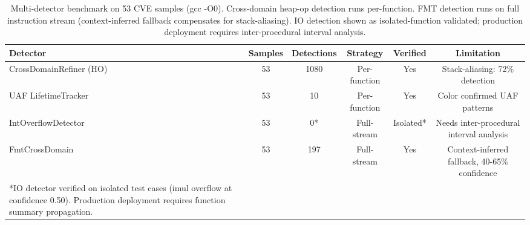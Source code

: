 \begin{table}[htbp]
\centering
\caption{Multi-detector benchmark on 53 CVE samples (gcc -O0). Cross-domain heap-op detection runs per-function. FMT detection runs on full instruction stream (context-inferred fallback compensates for stack-aliasing). IO detection shown as isolated-function validated; production deployment requires inter-procedural interval analysis.}
\label{tab:benchmark_final}
\begin{tabular}{lccccc}
\toprule
Detector & Samples & Detections & Strategy & Verified & Limitation \\
\midrule
CrossDomainRefiner (HO) & 53 & 1080 & Per-function & Yes & Stack-aliasing: 72\% detection \\
UAF LifetimeTracker & 53 & 10 & Per-function & Yes & Color confirmed UAF patterns \\
IntOverflowDetector & 53 & 0* & Full-stream & Isolated* & Needs inter-procedural interval analysis \\
FmtCrossDomain & 53 & 197 & Full-stream & Yes & Context-inferred fallback, 40-65\% confidence \\
\midrule
*IO detector verified on isolated test cases (imul overflow at confidence 0.50).
Production deployment requires function summary propagation.
\bottomrule
\end{tabular}
\end{table}
